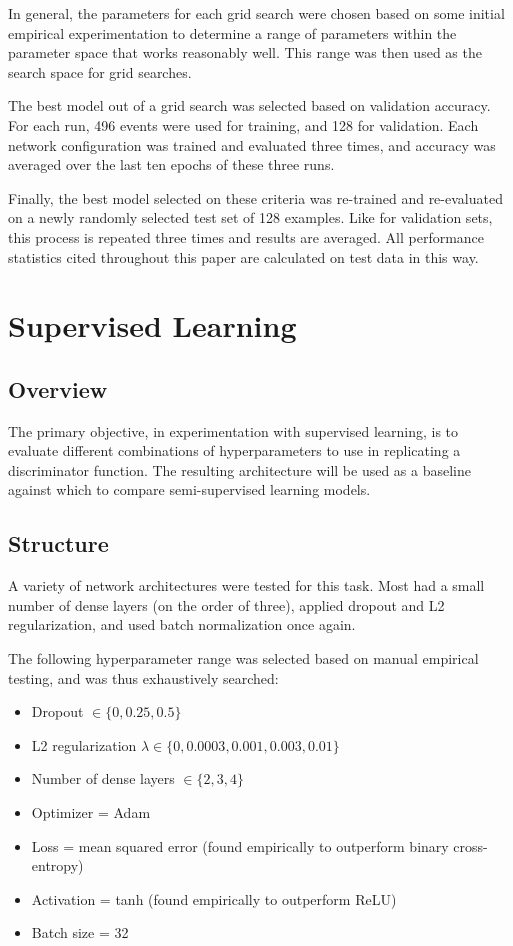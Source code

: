 \documentclass[10pt]{article}
\begin{document}
In general, the parameters for each grid search were chosen based on some initial empirical experimentation to determine a range of parameters within the parameter space that works reasonably well. This range was then used as the search space for grid searches.

The best model out of a grid search was selected based on validation accuracy. For each run, 496 events were used for training, and 128 for validation. Each network configuration was trained and evaluated three times, and accuracy was averaged over the last ten epochs of these three runs.

Finally, the best model selected on these criteria was re-trained and re-evaluated on a newly randomly selected test set of 128 examples. Like for validation sets, this process is repeated three times and results are averaged. All performance statistics cited throughout this paper are calculated on test data in this way.

\section{Supervised Learning} \label{supervised}

\subsection{Overview}

The primary objective, in experimentation with supervised learning, is to evaluate different combinations of hyperparameters to use in replicating a discriminator function. The resulting architecture will be used as a baseline against which to compare semi-supervised learning models.

\subsection{Structure}

A variety of network architectures were tested for this task. Most had a small number of dense layers (on the order of three), applied dropout and L2 regularization, and used batch normalization once again.

The following hyperparameter range was selected based on manual empirical testing, and was thus exhaustively searched:
\begin{itemize}
    \item Dropout $\in \{0, 0.25, 0.5\}$
    \item L2 regularization $\lambda \in \{0, 0.0003, 0.001, 0.003, 0.01\}$
    \item Number of dense layers $\in \{2, 3, 4\}$
    \item Optimizer = Adam \cite{adam}
    \item Loss = mean squared error (found empirically to outperform binary cross-entropy)
    \item Activation = tanh (found empirically to outperform ReLU)
    \item Batch size = 32
\end{itemize}
\end{document}
